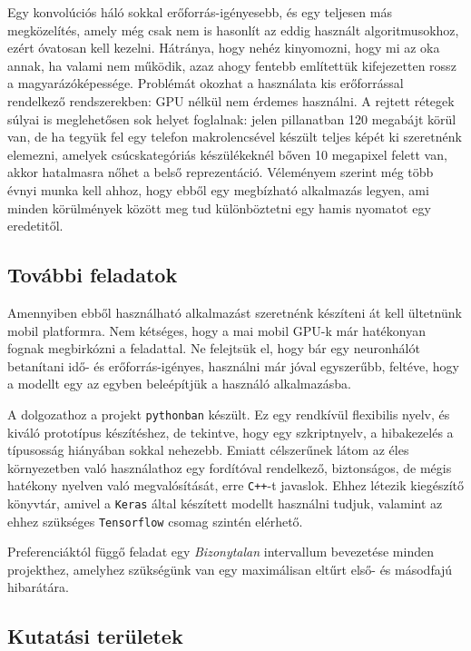 Egy konvolúciós háló sokkal erőforrás-igényesebb, és egy teljesen más megközelítés,
amely még csak nem is hasonlít az eddig használt algoritmusokhoz, ezért óvatosan kell 
kezelni. Hátránya, hogy nehéz kinyomozni, hogy mi az oka annak, ha valami nem működik,
azaz ahogy fentebb említettük
kifejezetten rossz a magyarázóképessége. Problémát okozhat a használata kis erőforrással 
rendelkező rendszerekben: GPU nélkül nem érdemes használni. A rejtett rétegek súlyai is 
meglehetősen sok helyet foglalnak: jelen pillanatban 120 megabájt körül van, de ha tegyük
fel egy telefon makrolencsével készült teljes képét ki szeretnénk elemezni, 
amelyek csúcskategóriás készülékeknél bőven 10 megapixel felett van, akkor hatalmasra 
nőhet a belső reprezentáció. Véleményem szerint még több évnyi munka kell ahhoz, hogy 
ebből egy megbízható alkalmazás legyen, ami minden körülmények között meg tud 
különböztetni egy hamis nyomatot egy eredetitől.


\subsection{További feladatok}

Amennyiben ebből használható alkalmazást szeretnénk készíteni át kell ültetnünk mobil 
platformra. Nem kétséges, hogy a mai mobil GPU-k már hatékonyan fognak megbirkózni a
feladattal. Ne felejtsük el, hogy bár egy neuronhálót betanítani idő- és erőforrás-igényes,
használni már jóval egyszerűbb, feltéve, hogy a modellt egy az egyben beleépítjük a használó
alkalmazásba.


A dolgozathoz a projekt \texttt{pythonban} készült. Ez egy rendkívül flexibilis nyelv, és
kiváló prototípus készítéshez, de tekintve, hogy egy szkriptnyelv, a hibakezelés a 
típusosság hiányában sokkal nehezebb. Emiatt célszerűnek látom az éles környezetben 
való használathoz egy fordítóval rendelkező, biztonságos, de mégis hatékony nyelven 
való megvalósítását, erre \texttt{C++}-t javaslok. Ehhez létezik kiegészítő könyvtár,
amivel a \texttt{Keras} által készített modellt használni tudjuk, valamint az 
ehhez szükséges 
\texttt{Tensorflow} csomag szintén elérhető.


Preferenciáktól függő feladat egy \textit{Bizonytalan} intervallum bevezetése minden
projekthez, amelyhez szükségünk van egy maximálisan eltűrt első- és másodfajú hibarátára.

\subsection{Kutatási területek}

